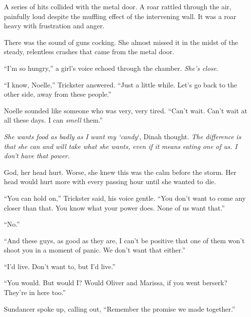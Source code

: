 A series of hits collided with the metal door.  A roar rattled through the air, painfully loud despite the muffling effect of the intervening wall.  It was a roar heavy with frustration and anger.



There was the sound of guns cocking.  She almost missed it in the midst of the steady, relentless crashes that came from the metal door.



``I'm so hungry,'' a girl's voice echoed through the chamber.  \emph{She's close}.



``I know, Noelle,'' Trickster answered.  ``Just a little while.  Let's go back to the other side, away from these people.''



Noelle sounded like someone who was very, very tired.  ``Can't wait.  Can't wait at all these days.  I can \emph{smell} them.''



\emph{She wants food as badly as I want my `candy}`, Dinah thought.  \emph{The difference is that she can and will take what she wants, even if it means eating one of us.  I don't have that power.}



God, her head hurt.  Worse, she knew this was the calm before the storm.  Her head would hurt more with every passing hour until she wanted to die.



``You can hold on,'' Trickster said, his voice gentle.  ``You don't want to come any closer than that.  You know what your power does.  None of us want that.''



``No.''



``And these guys, as good as they are, I can't be positive that one of them won't shoot you in a moment of panic.  We don't want that either.''



``I'd live.  Don't want to, but I'd live.''



``You would.  But would I?  Would Oliver and Marissa, if you went berserk?  They're in here too.''



Sundancer spoke up, calling out, ``Remember the promise we made together.''



